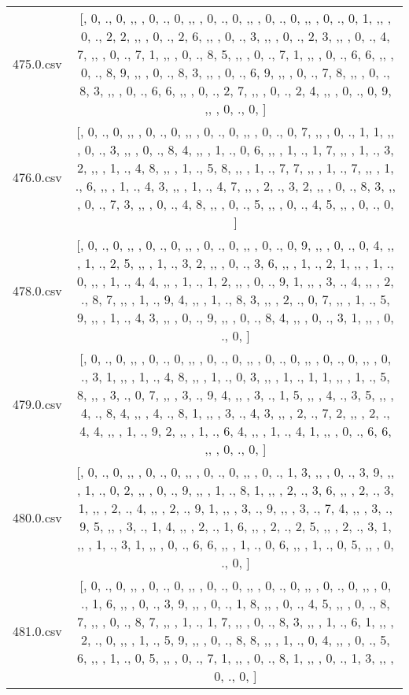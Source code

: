 \begin{table}[ht]
\begin{tabular}{@{}c c@{}}
	475.0.csv & [, 0, ., 0, ,,  , 0, ., 0, ,,  , 0, ., 0, ,,  , 0, ., 0, ,,  , 0, ., 0, 1, ,,  , 0, ., 2, 2, ,,  , 0, ., 2, 6, ,,  , 0, ., 3, ,,  , 0, ., 2, 3, ,,  , 0, ., 4, 7, ,,  , 0, ., 7, 1, ,,  , 0, ., 8, 5, ,,  , 0, ., 7, 1, ,,  , 0, ., 6, 6, ,,  , 0, ., 8, 9, ,,  , 0, ., 8, 3, ,,  , 0, ., 6, 9, ,,  , 0, ., 7, 8, ,,  , 0, ., 8, 3, ,,  , 0, ., 6, 6, ,,  , 0, ., 2, 7, ,,  , 0, ., 2, 4, ,,  , 0, ., 0, 9, ,,  , 0, ., 0, ]\\ 
	476.0.csv & [, 0, ., 0, ,,  , 0, ., 0, ,,  , 0, ., 0, ,,  , 0, ., 0, 7, ,,  , 0, ., 1, 1, ,,  , 0, ., 3, ,,  , 0, ., 8, 4, ,,  , 1, ., 0, 6, ,,  , 1, ., 1, 7, ,,  , 1, ., 3, 2, ,,  , 1, ., 4, 8, ,,  , 1, ., 5, 8, ,,  , 1, ., 7, 7, ,,  , 1, ., 7, ,,  , 1, ., 6, ,,  , 1, ., 4, 3, ,,  , 1, ., 4, 7, ,,  , 2, ., 3, 2, ,,  , 0, ., 8, 3, ,,  , 0, ., 7, 3, ,,  , 0, ., 4, 8, ,,  , 0, ., 5, ,,  , 0, ., 4, 5, ,,  , 0, ., 0, ]\\ 
	478.0.csv & [, 0, ., 0, ,,  , 0, ., 0, ,,  , 0, ., 0, ,,  , 0, ., 0, 9, ,,  , 0, ., 0, 4, ,,  , 1, ., 2, 5, ,,  , 1, ., 3, 2, ,,  , 0, ., 3, 6, ,,  , 1, ., 2, 1, ,,  , 1, ., 0, ,,  , 1, ., 4, 4, ,,  , 1, ., 1, 2, ,,  , 0, ., 9, 1, ,,  , 3, ., 4, ,,  , 2, ., 8, 7, ,,  , 1, ., 9, 4, ,,  , 1, ., 8, 3, ,,  , 2, ., 0, 7, ,,  , 1, ., 5, 9, ,,  , 1, ., 4, 3, ,,  , 0, ., 9, ,,  , 0, ., 8, 4, ,,  , 0, ., 3, 1, ,,  , 0, ., 0, ]\\ 
	479.0.csv & [, 0, ., 0, ,,  , 0, ., 0, ,,  , 0, ., 0, ,,  , 0, ., 0, ,,  , 0, ., 0, ,,  , 0, ., 3, 1, ,,  , 1, ., 4, 8, ,,  , 1, ., 0, 3, ,,  , 1, ., 1, 1, ,,  , 1, ., 5, 8, ,,  , 3, ., 0, 7, ,,  , 3, ., 9, 4, ,,  , 3, ., 1, 5, ,,  , 4, ., 3, 5, ,,  , 4, ., 8, 4, ,,  , 4, ., 8, 1, ,,  , 3, ., 4, 3, ,,  , 2, ., 7, 2, ,,  , 2, ., 4, 4, ,,  , 1, ., 9, 2, ,,  , 1, ., 6, 4, ,,  , 1, ., 4, 1, ,,  , 0, ., 6, 6, ,,  , 0, ., 0, ]\\ 
	480.0.csv & [, 0, ., 0, ,,  , 0, ., 0, ,,  , 0, ., 0, ,,  , 0, ., 1, 3, ,,  , 0, ., 3, 9, ,,  , 1, ., 0, 2, ,,  , 0, ., 9, ,,  , 1, ., 8, 1, ,,  , 2, ., 3, 6, ,,  , 2, ., 3, 1, ,,  , 2, ., 4, ,,  , 2, ., 9, 1, ,,  , 3, ., 9, ,,  , 3, ., 7, 4, ,,  , 3, ., 9, 5, ,,  , 3, ., 1, 4, ,,  , 2, ., 1, 6, ,,  , 2, ., 2, 5, ,,  , 2, ., 3, 1, ,,  , 1, ., 3, 1, ,,  , 0, ., 6, 6, ,,  , 1, ., 0, 6, ,,  , 1, ., 0, 5, ,,  , 0, ., 0, ]\\ 
	481.0.csv & [, 0, ., 0, ,,  , 0, ., 0, ,,  , 0, ., 0, ,,  , 0, ., 0, ,,  , 0, ., 0, ,,  , 0, ., 1, 6, ,,  , 0, ., 3, 9, ,,  , 0, ., 1, 8, ,,  , 0, ., 4, 5, ,,  , 0, ., 8, 7, ,,  , 0, ., 8, 7, ,,  , 1, ., 1, 7, ,,  , 0, ., 8, 3, ,,  , 1, ., 6, 1, ,,  , 2, ., 0, ,,  , 1, ., 5, 9, ,,  , 0, ., 8, 8, ,,  , 1, ., 0, 4, ,,  , 0, ., 5, 6, ,,  , 1, ., 0, 5, ,,  , 0, ., 7, 1, ,,  , 0, ., 8, 1, ,,  , 0, ., 1, 3, ,,  , 0, ., 0, ]\\ 

\end{tabular}
\end{table}
